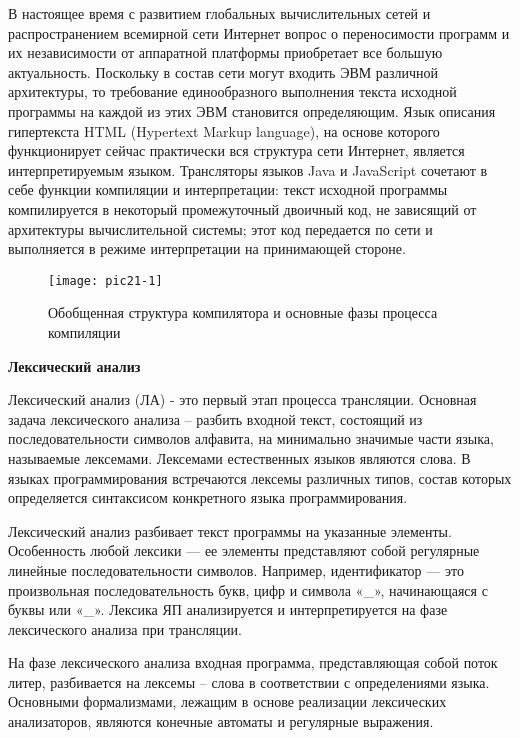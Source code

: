 В настоящее время с развитием глобальных вычислительных сетей и распространением всемирной сети Интернет вопрос о переносимости программ и их независимости от аппаратной платформы приобретает все большую актуальность. Поскольку в состав сети могут входить ЭВМ различной архитектуры, то требование единообразного выполнения текста исходной программы на каждой из этих ЭВМ становится определяющим. Язык описания гипертекста HTML (Hypertext Markup language), на основе которого функционирует сейчас практически вся структура сети Интернет, является интерпретируемым языком. Трансляторы языков Java и JavaScript сочетают в себе функции компиляции и интерпретации: текст исходной программы компилируется в некоторый промежуточный двоичный код, не зависящий от архитектуры вычислительной системы; этот код передается по сети и выполняется в режиме интерпретации на принимающей стороне.

\begin{figure}
\begin{center}
\texttt{[image: pic21-1]}
\caption*{Обобщенная структура компилятора и основные фазы процесса компиляции}
\end{center}
\end{figure}

\begin{center}{\bfseries Лексический анализ}
\end{center}
  
\begin{opr}
  Лексический анализ (ЛА) - это первый этап процесса трансляции. Основная задача лексического анализа – разбить входной текст, состоящий из последовательности символов алфавита, на минимально значимые части языка, называемые лексемами. Лексемами естественных языков являются слова. В языках программирования встречаются лексемы различных типов, состав которых определяется синтаксисом конкретного языка программирования.
\end{opr}

Лексический анализ разбивает текст программы на указанные элементы. Особенность любой лексики — ее элементы представляют собой регулярные линейные последовательности символов. Например, идентификатор — это произвольная последовательность букв, цифр и символа «_», начинающаяся с буквы или «_». Лексика ЯП анализируется и интерпретируется на фазе лексического анализа при трансляции.

На фазе лексического анализа входная программа, представляющая собой поток литер, разбивается на лексемы – слова в соответствии с определениями языка. Основными формализмами, лежащим в основе реализации лексических анализаторов, являются конечные автоматы и регулярные выражения.

